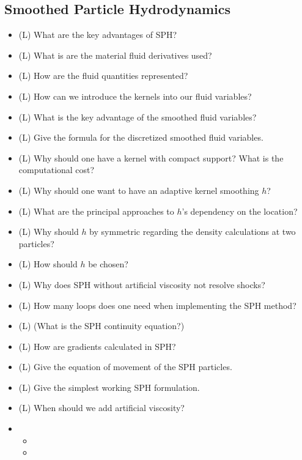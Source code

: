 \subsection*{Smoothed Particle Hydrodynamics}

\begin{itemize}
    \item (L) What are the key advantages of SPH?
    \item (L) What is are the material fluid derivatives used?
    \item (L) How are the fluid quantities represented?
    \item (L) How can we introduce the kernels into our fluid variables?
    \item (L) What is the key advantage of the smoothed fluid variables?
    \item (L) Give the formula for the discretized smoothed fluid variables.
    \item (L) Why should one have a kernel with compact support? What is the computational cost?
    \item (L) Why should one want to have an adaptive kernel smoothing $h$?
    \item (L) What are the principal approaches to $h$'s dependency on the location?
    \item (L) Why should $h$ by symmetric regarding the density calculations at two particles?
    \item (L) How should $h$ be chosen?
    \item (L) Why does SPH without artificial viscosity not resolve shocks?
    \item (L) How many loops does one need when implementing the SPH method?
    \item (L) (What is the SPH continuity equation?)
    \item (L) How are gradients calculated in SPH?
    \item (L) Give the equation of movement of the SPH particles.
    \item (L) Give the simplest working SPH formulation.
    \item (L) When should we add artificial viscosity?
    \item \begin{itemize}
        \item {}
        \item {}

\end{itemize}
\end{itemize}
